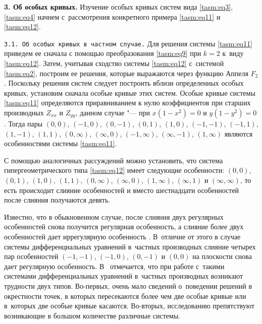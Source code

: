 \smallskip

\textbf{3. Об особых кривых.} Изучение особых кривых систем вида \eqref{tasm:eq3}, \eqref{tasm:eq4} начнем с~рассмотрения конкретного примера \eqref{tasm:eq11} и \eqref{tasm:eq12}.


\smallskip

\texttt{3.1. Об особых кривых в частном случае.} 
Для решения системы \eqref{tasm:eq11} \linebreak приведем ее сначала  с помощью преобразования \eqref{tasm:eq9} при $k=2$ к~виду \eqref{tasm:eq12}. Затем, учитывая сходство системы \eqref{tasm:eq12} с~системой \eqref{tasm:eq2}, построим ее
решения, которые выражаются через функцию Аппеля $F_{2}$.
Поскольку решения систем следует построить вблизи определенных особых кривых, установим сначала особые кривые этих систем.
Особые кривые системы \eqref{tasm:eq11} определяются приравниванием к нулю коэффициентов при старших производных $Z_{xx}$ и $Z_{yy}$, данном случае "--- при $x(1-x^{2})=0$ и $y(1-y^{2})=0$. 
Тогда пары $(0, 0)$, $(-1, 0)$, $(0, -1)$, $(0, 1)$, $(1, 0)$, $(-1, -1)$,
$(-1, 1)$, $(1, -1)$, $(1, 1)$, $(0, \infty)$, $(\infty, 0)$, ${(-1, \infty)}$, $(\infty, -1)$, $(1, \infty)$ являются особенностями системы \eqref{tasm:eq11}.

С помощью аналогичных рассуждений можно установить, что система
гипергеометрического типа \eqref{tasm:eq12} имеет следующие особенности: $(0, 0)$,
$(0, 1)$, $(1, 0)$, $(1, 1)$, $(0, \infty)$, $(\infty, 0)$, $(1, \infty)$, $(\infty, 1)$ и $(\infty, \infty)$, то есть происходит слияние особенностей и вместо шестнадцати особенностей после слияния получаются девять.

Известно, что в обыкновенном случае, после слияния двух регулярных особенностей снова получится регулярная особенность, а слияние более двух особенностей дает иррегулярную особенность \cite{tasm:8}. 
В~отличие от этого в случае системы дифференциальных уравнений в~частных производных 
слияние четырех пар особенностей $(-1, -1)$, $(-1, 0)$, $(0, -1)$ и $(0, 0)$ на плоскости снова дает регулярную особенность. 
В~\cite[p.~230]{tasm:6} отмечается, что  при работе с~такими системами дифференциальных уравнений в~частных производных
возникают трудности двух типов. 
Во-первых, очень мало сведений о~поведении решений в окрестности точек, в которых пересекаются более чем две особые кривые или в~которых две особые кривые касаются.
Во-вторых, исследованию препятствуют возникающие в большом количестве различные системы.

\smallskip

